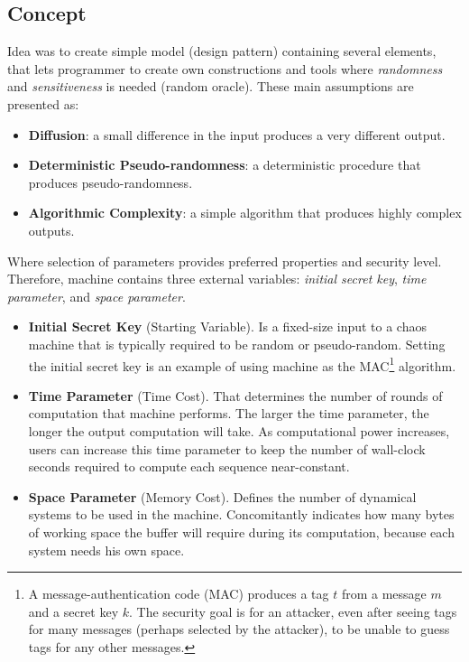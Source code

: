 \documentclass[twocolumn, a4paper, 10pt]{article}
\begin{document}
\subsection{Concept}
\label{ssec:concept}

Idea was to create simple model (design pattern) containing several elements, that lets programmer to create own constructions and tools where \textit{randomness} and \textit{sensitiveness} is needed (random oracle). These main assumptions are presented as:

\begin{itemize}

\item\textbf{Diffusion}: a small difference in the input produces a very different output.

\item\textbf{Deterministic Pseudo-randomness}: a deterministic procedure that produces pseudo-randomness.

\item\textbf{Algorithmic Complexity}: a simple algorithm that produces highly complex outputs.

\end{itemize}

Where selection of parameters provides preferred properties and security level. Therefore, machine contains three external variables: \textit{initial secret key}, \textit{time parameter}, and \textit{space parameter}.

\begin{itemize}

\item\textbf{Initial Secret Key} (Starting Variable). Is a fixed-size input to a chaos machine that is typically required to be random or pseudo-random. Setting the initial secret key is an example of using machine as the MAC\footnote{A message-authentication code (MAC) produces a tag $t$ from a message $m$ and a secret key $k$. The security goal is for an attacker, even after seeing tags for many messages (perhaps selected by the attacker), to be unable to guess tags for any other messages.} algorithm.

\item\textbf{Time Parameter} (Time Cost). That determines the number of rounds of computation that machine performs. The larger the time parameter, the longer the output computation will take. As computational power increases, users can increase this time parameter to keep the number of wall-clock seconds required to compute each sequence near-constant.

\item\textbf{Space Parameter} (Memory Cost). Defines the number of dynamical systems to be used in the machine. Concomitantly indicates how many bytes of working space the buffer will require during its computation, because each system needs his own space.

\end{itemize}
\end{document}
